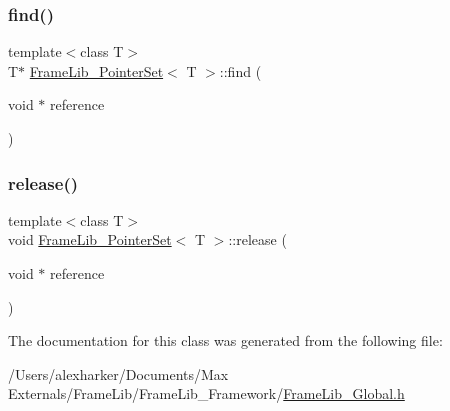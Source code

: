 \mbox{\label{class_frame_lib___pointer_set_ae088998b19a4ad6bc3940c92a1599793}} 
\subsubsection{\texorpdfstring{find()}{find()}}
{\footnotesize\ttfamily template$<$class T$>$ \\
T$\ast$ \hyperlink{class_frame_lib___pointer_set}{Frame\+Lib\+\_\+\+Pointer\+Set}$<$ T $>$\+::find (\begin{DoxyParamCaption}\item[{void $\ast$}]{reference }\end{DoxyParamCaption})\hspace{0.3cm}{\ttfamily [inline]}}

\mbox{\label{class_frame_lib___pointer_set_a0180b8255af17da63729ea4cb904ed33}} 
\subsubsection{\texorpdfstring{release()}{release()}}
{\footnotesize\ttfamily template$<$class T$>$ \\
void \hyperlink{class_frame_lib___pointer_set}{Frame\+Lib\+\_\+\+Pointer\+Set}$<$ T $>$\+::release (\begin{DoxyParamCaption}\item[{void $\ast$}]{reference }\end{DoxyParamCaption})\hspace{0.3cm}{\ttfamily [inline]}}



The documentation for this class was generated from the following file\+:\begin{DoxyCompactItemize}
\item 
/\+Users/alexharker/\+Documents/\+Max Externals/\+Frame\+Lib/\+Frame\+Lib\+\_\+\+Framework/\hyperlink{_frame_lib___global_8h}{Frame\+Lib\+\_\+\+Global.\+h}\end{DoxyCompactItemize}
